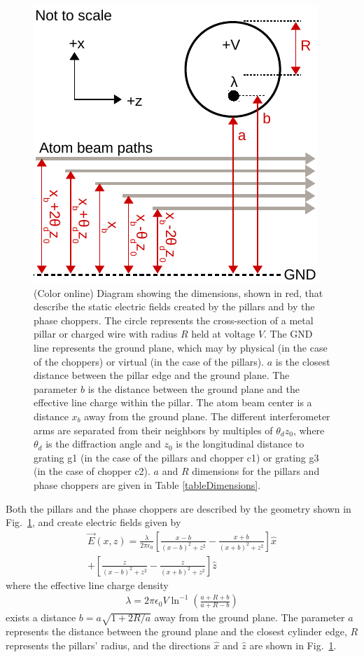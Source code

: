 \documentclass[twocolumn,pra,showpacs,superscriptaddress,longbibliography]{revtex4-1}   %
\newcommand{\figref}[1]{Fig.~\ref{#1}}
\begin{document}
\begin{figure}
\includegraphics[width=0.7\linewidth,keepaspectratio]{EDiagram2.pdf}
\caption{\label{EDiagram}(Color online) Diagram showing the dimensions, shown in red, that describe the static electric fields created by the pillars and by the phase choppers. The circle represents the cross-section of a metal pillar or charged wire with radius $R$ held at voltage $V$. The GND line represents the ground plane, which may by physical (in the case of the choppers) or virtual (in the case of the pillars). $a$ is the closest distance between the pillar edge and the ground plane. The parameter $b$ is the distance between the ground plane and the effective line charge within the pillar. The atom beam center is a distance $x_b$ away from the ground plane. The different interferometer arms are separated from their neighbors by multiples of $\theta_d z_0$, where $\theta_d$ is the diffraction angle and $z_0$ is the longitudinal distance to grating g1 (in the case of the pillars and chopper c1) or grating g3 (in the case of chopper c2). $a$ and $R$ dimensions for the pillars and phase choppers are given in Table \ref{tableDimensions}.}
\end{figure}

Both the pillars and the phase choppers are described by the geometry shown in \figref{EDiagram}, and create electric fields given by
\begin{align}
	\vec{E}(x,z) = \frac{\lambda}{2\pi\epsilon_0}
	\left[	
		\frac{x-b}{(x-b)^2+z^2} - \frac{x+b}{(x+b)^2+z^2}
	\right] \hat{x} \nonumber \\
	+ 
	\left[	
		\frac{z}{(x-b)^2+z^2} - \frac{z}{(x+b)^2+z^2}
	\right] \hat{z}
	\label{EPillars}
\end{align}
where the effective line charge density
\begin{align}
	\lambda = 2\pi\epsilon_0V\ln^{-1}
	\left(
		\frac{a+R+b}{a+R-b}
	\right)
	\label{lambda}
\end{align}
exists a distance $b = a\sqrt{1+2R/a}$ away from the ground plane. The parameter $a$ represents the distance between the ground plane and the closest cylinder edge, $R$ represents the pillars' radius, and the directions $\hat{x}$ and $\hat{z}$ are shown in \figref{EDiagram}.
\end{document}
